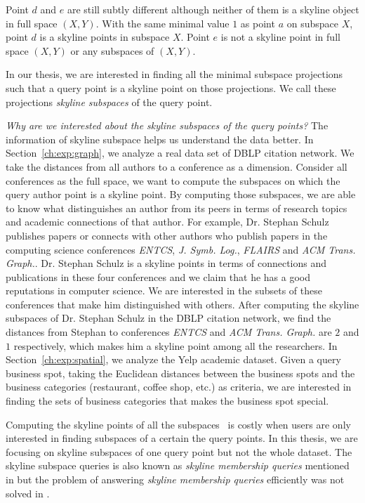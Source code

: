 Point $d$ and $e$ are still subtly different although neither of them is a skyline object in full space $(X, Y)$. With the same minimal value $1$ as point $a$ on subspace $X$, point $d$ is a skyline points in subspace $X$. Point $e$ is not a skyline point in full space $(X, Y)$ or any subspaces of $(X, Y)$.

In our thesis, we are interested in finding all the minimal subspace projections such that a query point is a skyline point on those projections. We call these projections \emph{skyline subspaces} of the query point.

\emph{Why are we interested about the skyline subspaces of the query points?} The information of skyline subspace helps us understand the data better. In Section~\ref{ch:exp:graph}, we analyze a real data set of DBLP citation network. We take the distances from all authors to a conference as a dimension. Consider all conferences as the full space, we want to compute the subspaces on which the query author point is a skyline point. By computing those subspaces, we are able to know what distinguishes an author from its peers in terms of research topics and academic connections of that author. For example, Dr. Stephan Schulz publishes papers or connects with other authors who publish papers in the computing science conferences \emph{ENTCS}, \emph{J. Symb. Log.}, \emph{FLAIRS} and \emph{ACM Trans. Graph.}. Dr. Stephan Schulz is a skyline points in terms of connections and publications in these four conferences and we claim that he has a good reputations in computer science. We are interested in the subsets of these conferences that make him distinguished with others. After computing the skyline subspaces of Dr. Stephan Schulz in the DBLP citation network, we find the distances from Stephan to conferences \emph{ENTCS} and \emph{ACM Trans. Graph.} are $2$ and $1$ respectively, which makes him a skyline point among all the researchers. In Section~\ref{ch:exp:spatial}, we analyze the Yelp academic dataset. Given a query business spot, taking the Euclidean distances between the business spots and the business categories (restaurant, coffee shop, etc.) as criteria, we are interested in finding the sets of business categories that makes the business spot special.

Computing the skyline points of all the subspaces~\cite{pei2005catching, yuan2005efficient} is costly when users are only interested in finding subspaces of a certain the query points. In this thesis, we are focusing on skyline subspaces of one query point but not the whole dataset. The skyline subspace queries is also known as \emph{skyline membership queries} mentioned in \cite{pei2005catching} but the problem of answering \emph{skyline membership queries} efficiently was not solved in \cite{pei2005catching}.

